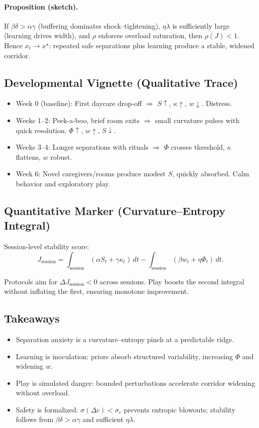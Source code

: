 \documentclass{article}
\theoremstyle{definition}
\begin{document}
\paragraph{Proposition (sketch).}  
If $\beta \delta > \alpha \gamma$ (buffering dominates shock–tightening), $\eta \lambda$ is sufficiently large (learning drives width), and $\rho$ enforces overload saturation, then $\rho(J) < 1$. Hence $x_t \to x^\star$: repeated safe separations plus learning produce a stable, widened corridor.

\subsection{Developmental Vignette (Qualitative Trace)}

\begin{itemize}
\item Week 0 (baseline): First daycare drop-off $\Rightarrow$ $S \!\uparrow$, $\kappa \!\uparrow$, $w \!\downarrow$. Distress.
\item Weeks 1–2: Peek-a-boo, brief room exits $\Rightarrow$ small curvature pulses with quick resolution. $\Phi \!\uparrow$, $w \!\uparrow$, $S \!\downarrow$.
\item Weeks 3–4: Longer separations with rituals $\Rightarrow$ $\Phi$ crosses threshold, $\kappa$ flattens, $w$ robust.
\item Week 6: Novel caregivers/rooms produce modest $S$, quickly absorbed. Calm behavior and exploratory play.
\end{itemize}

\subsection{Quantitative Marker (Curvature–Entropy Integral)}

Session-level stability score:
\[
J_{\mathrm{session}} = \int_{\mathrm{session}} (\alpha S_t + \gamma \kappa_t)\, dt
 - \int_{\mathrm{session}} (\beta w_t + \eta \Phi_t)\, dt.
\]

Protocols aim for $\Delta J_{\mathrm{session}} < 0$ across sessions. Play boosts the second integral without inflating the first, ensuring monotone improvement.

\subsection{Takeaways}

\begin{itemize}
\item Separation anxiety is a curvature–entropy pinch at a predictable ridge.  
\item Learning is inoculation: priors absorb structured variability, increasing $\Phi$ and widening $w$.  
\item Play is simulated danger: bounded perturbations accelerate corridor widening without overload.  
\item Safety is formalized: $\sigma(\Delta c) < \sigma_c$ prevents entropic blowouts; stability follows from $\beta \delta > \alpha \gamma$ and sufficient $\eta \lambda$.  
\end{itemize}
\end{document}
